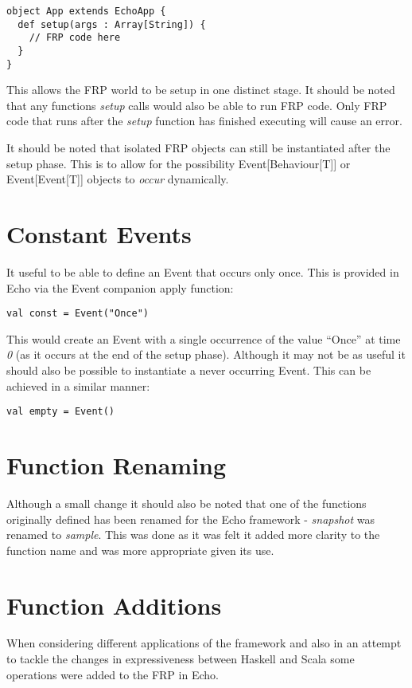 \begin{verbatim}
object App extends EchoApp {
  def setup(args : Array[String]) {
    // FRP code here
  }
}
\end{verbatim}
  
    This allows the FRP world to be setup in one distinct stage. It should be noted that
    any functions \emph{setup} calls would also be able to run FRP code. Only FRP code that runs
    after the \emph{setup} function has finished executing will cause an error.
    
    It should be noted that isolated FRP objects can still be instantiated after the setup phase. This is
    to allow for the possibility Event[Behaviour[T]] or Event[Event[T]] objects to \emph{occur}
    dynamically.
  
  \section{Constant Events}
    It useful to be able to define an Event that occurs only once. This is provided in Echo
    via the Event companion apply function:

\begin{verbatim}
val const = Event("Once")
\end{verbatim}    

    This would create an Event with a single occurrence of the value ``Once'' at time \emph{0} (as
    it occurs at the end of the setup phase).
    Although it may not be as useful it should also be possible to instantiate a never occurring
    Event. This can be achieved in a similar manner:

\begin{verbatim}
val empty = Event()
\end{verbatim}
     
  \section{Function Renaming}
    Although a small change it should also be noted that one of the functions originally defined
    has been renamed for the Echo framework - \emph{snapshot} was renamed to \emph{sample}. This was done as
    it was felt it added more clarity to the function name and was more appropriate given its use.
    
  \section{Function Additions}
    When considering different applications of the framework and also in an attempt to
    tackle the changes in expressiveness between Haskell and Scala some operations
    were added to the FRP in Echo.
    
